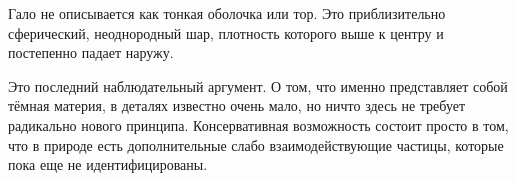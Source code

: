 Гало не описывается как тонкая оболочка или тор. Это приблизительно сферический, неоднородный шар, плотность которого выше к центру и постепенно падает наружу.

\begin{classroomqa}
\end{classroomqa}

Это последний наблюдательный аргумент. О том, что именно представляет собой тёмная материя, в деталях известно очень мало, но ничто здесь не требует радикально нового принципа. Консервативная возможность состоит просто в том, что в природе есть дополнительные слабо взаимодействующие частицы, которые пока еще не идентифицированы.